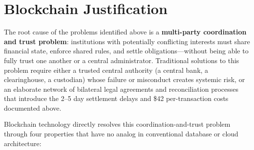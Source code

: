 \documentclass[12pt,a4paper]{report}
\begin{document}
\section{Blockchain Justification}

The root cause of the problems identified above is a \textbf{multi-party coordination and trust problem}: institutions with potentially conflicting interests must share financial state, enforce shared rules, and settle obligations---without being able to fully trust one another or a central administrator. Traditional solutions to this problem require either a trusted central authority (a central bank, a clearinghouse, a custodian) whose failure or misconduct creates systemic risk, or an elaborate network of bilateral legal agreements and reconciliation processes that introduce the 2--5 day settlement delays and \$42 per-transaction costs documented above.

Blockchain technology directly resolves this coordination-and-trust problem through four properties that have no analog in conventional database or cloud architecture:
\end{document}
